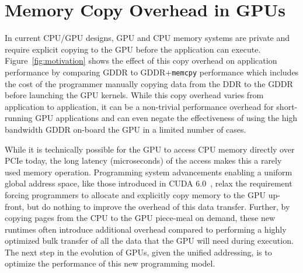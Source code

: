 
\section{Memory Copy Overhead in GPUs}
In current CPU/GPU designs, GPU and CPU memory systems are private and require
explicit copying to the GPU before the application can execute.
Figure~\ref{fig:motivation} shows the effect of this copy overhead on
application performance by comparing GDDR to GDDR+{\tt memcpy} performance which
includes the cost of the programmer manually copying data from the DDR to the
GDDR before launching the GPU kernels.  While this copy overhead varies from
application to application, it can be a non-trivial performance overhead for
short-running GPU applications and can even negate the effectiveness of using
the high bandwidth GDDR on-board the GPU in a limited number of cases.

While it is technically possible for the GPU to access CPU memory directly over
PCIe today, the long latency (microseconds) of the access makes this a rarely
used memory operation.  Programming system advancements enabling a uniform
global address space, like those introduced in CUDA 6.0~\cite{cuda}, relax the
requirement forcing programmers to allocate and explicitly copy memory to the
GPU up-front, but do nothing to improve the overhead of this data transfer.
Further, by copying pages from the CPU to the GPU piece-meal on demand, these
new runtimes often introduce additional overhead compared to performing a highly
optimized bulk transfer of all the data that the GPU will need during execution.
The next step in the evolution of GPUs, given the unified addressing, is to
optimize the performance of this new programming model. 

